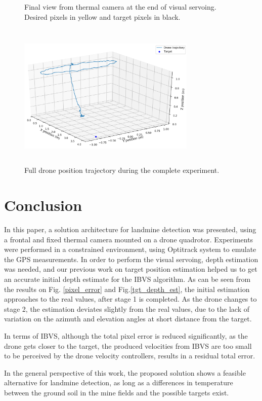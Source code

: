 \documentclass[conference]{IEEEtran}
\begin{document}
\begin{figure}
\begin{minipage}[t]{0.475\linewidth}
        \caption{Final view from thermal camera at the end of visual servoing. Desired pixels in yellow and target pixels in black.}
        \label{final}
    \end{minipage} 
\end{figure}

\begin{figure}
\centering
\includegraphics[width=8.5cm, height=7cm]{Images/3d_pos_traj.png}
\caption{Full drone position trajectory during the complete experiment.}
\label{full_drone_traj}
\end{figure}

\section{Conclusion}
In this paper, a solution architecture for landmine detection was presented, using a frontal and fixed thermal camera mounted on a drone quadrotor. Experiments were performed in a constrained environment, using Optitrack system to emulate the GPS measurements. In order to perform the visual servoing, depth estimation was needed, and our previous work on target position estimation helped us to get an accurate initial depth estimate for the IBVS algorithm. As can be seen from the results on Fig. \ref{pixel_error} and Fig.\ref{tgt_depth_est}, the initial estimation approaches to the real values, after stage 1 is completed. As the drone changes to stage 2, the estimation deviates slightly from the real values, due to the lack of variation on the azimuth and elevation angles at short distance from the target. 

In terms of IBVS, although the total pixel error is reduced significantly, as the drone gets closer to the target, the produced velocities from IBVS are too small to be perceived by the drone velocity controllers, results in a residual total error.

In the general perspective of this work, the proposed solution shows a feasible alternative for landmine detection, as long as a differences in temperature between the ground soil in the mine fields and the possible targets exist.



\end{document}
